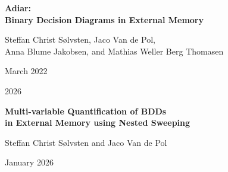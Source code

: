 \documentclass[english, aspectratio=169]{beamer}
\begin{document}
\begin{frame}
  \begin{center}
    {\bf {\huge Adiar:}\\{\LARGE Binary Decision Diagrams in External Memory}}

    {\large Steffan Christ Sølvsten, Jaco Van de Pol,\\Anna Blume Jakobsen,
      and Mathias Weller Berg Thomasen}


    {\footnotesize March 2022}
  \end{center}
\end{frame}

\begin{frame}

  \begin{center}
    \bf
    {\fontsize{42}{50}\selectfont {}}

    \vspace{10pt}

    {\Huge 2026}
  \end{center}
\end{frame}

\begin{frame}
  \begin{center}
    {\LARGE\bf Multi-variable Quantification of BDDs\\in External Memory using Nested Sweeping}

    {\large Steffan Christ Sølvsten and Jaco Van de Pol}


    {\footnotesize January 2026}
  \end{center}
\end{frame}
\end{document}
